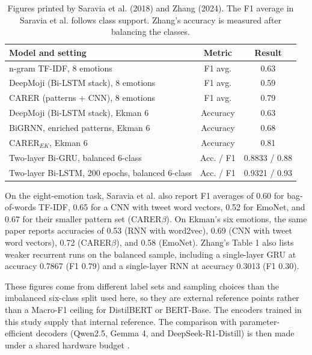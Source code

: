 \documentclass[conference]{IEEEtran}
\begin{document}
\begin{table}[htbp]
\centering
\caption{Figures printed by Saravia et al. (2018) and Zhang (2024). The F1 average in Saravia et al. follows class support. Zhang's accuracy is measured after balancing the classes.}
\label{tab:published_baselines}
\fontsize{7pt}{8.5pt}\selectfont
\begin{tabularx}{\columnwidth}{@{} >{\raggedright\arraybackslash}X c c @{}}
\toprule
\textbf{Model and setting} & \textbf{Metric} & \textbf{Result} \\
\midrule
n-gram TF-IDF, 8 emotions \cite{saravia2018carer} & F1 avg. & 0.63 \\
DeepMoji (Bi-LSTM stack), 8 emotions \cite{saravia2018carer} & F1 avg. & 0.59 \\
CARER (patterns + CNN), 8 emotions \cite{saravia2018carer} & F1 avg. & 0.79 \\
DeepMoji (Bi-LSTM stack), Ekman 6 \cite{saravia2018carer} & Accuracy & 0.63 \\
BiGRNN, enriched patterns, Ekman 6 \cite{saravia2018carer} & Accuracy & 0.68 \\
CARER$_{EK}$, Ekman 6 \cite{saravia2018carer} & Accuracy & 0.81 \\
Two-layer Bi-GRU, balanced 6-class \cite{zhang2024comparative} & Acc. / F1 & 0.8833 / 0.88 \\
Two-layer Bi-LSTM, 200 epochs, balanced 6-class \cite{zhang2024comparative} & Acc. / F1 & 0.9321 / 0.93 \\
\bottomrule
\end{tabularx}
\end{table}

On the eight-emotion task, Saravia et al. also report F1 averages of 0.60 for bag-of-words TF-IDF, 0.65 for a CNN with tweet word vectors, 0.52 for EmoNet, and 0.67 for their smaller pattern set (CARER$\beta$). On Ekman's six emotions, the same paper reports accuracies of 0.53 (RNN with word2vec), 0.69 (CNN with tweet word vectors), 0.72 (CARER$\beta$), and 0.58 (EmoNet). Zhang's Table 1 also lists weaker recurrent runs on the balanced sample, including a single-layer GRU at accuracy 0.7867 (F1 0.79) and a single-layer RNN at accuracy 0.3013 (F1 0.30).

These figures come from different label sets and sampling choices than the imbalanced six-class split used here, so they are external reference points rather than a Macro-F1 ceiling for DistilBERT or BERT-Base. The encoders trained in this study supply that internal reference. The comparison with parameter-efficient decoders (Qwen2.5, Gemma 4, and DeepSeek-R1-Distill) is then made under a shared hardware budget \cite{nwaiwu2025peft, mohammed2026deepfake}.
\end{document}
